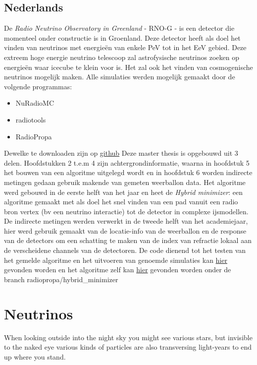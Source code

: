 \documentclass[11pt,a4paper,faculty=we,language=en,doctype=report]{cls/ugent-doc}
\begin{document}
\newpage
\section*{Nederlands}
De \textit{Radio Neutrino Observatory in Greenland} - RNO-G - is een detector
die momenteel onder constructie is in Groenland. Deze detector heeft als doel
het vinden van neutrinos met energieën van enkele PeV tot in het EeV gebied.
Deze extreem hoge energie neutrino telescoop zal astrofysische neutrinos zoeken
op energieën waar icecube te klein voor is. Het zal ook het vinden van
cosmogenische neutrinos mogelijk maken.  Alle simulaties werden mogelijk
gemaakt door de volgende programmas:
\begin{itemize}
	\item NuRadioMC
	\item radiotools
	\item RadioPropa
\end{itemize}
Dewelke te downloaden zijn op \href{https://github.com/nu-radio}{github} Deze
master thesis is opgebouwd uit 3 delen. Hoofdstukken 2 t.e.m 4 zijn
achtergrondinformatie, waarna in hoofdstuk 5 het bouwen van een algoritme
uitgelegd wordt en in hoofdstuk 6 worden indirecte metingen gedaan gebruik makende
van gemeten weerballon data.  Het algoritme werd gebouwd in de eerste helft
van het jaar en heet de \textit{Hybrid minimizer}: een algoritme gemaakt met als
doel het snel vinden van een pad vanuit een radio bron vertex (bv een neutrino
interactie) tot de detector in complexe ijsmodellen. De indirecte metingen
werden verwerkt in de tweede helft van het academiejaar, hier werd gebruik
gemaakt van de locatie-info van de weerballon en de response van de detectors
om een schatting te maken van de index van refractie lokaal aan de verscheidene
channels van de detectoren.
De code dienend tot het testen van het gemelde algoritme en het uitvoeren van 
genoemde simulaties kan \href{https://github.com/arthuradriaens-code/projects-mt}{hier}
gevonden worden en het algoritme zelf kan \href{https://github.com/arthuradriaens-code/NuRadioMC}{hier}
gevonden worden onder de branch radiopropa/hybrid\_minimizer
\chapter{Neutrinos}

When looking outside into the night sky you might see various stars, but
invisible to the naked eye various kinds of particles are also transversing
light-years to end up where you stand.
\end{document}
